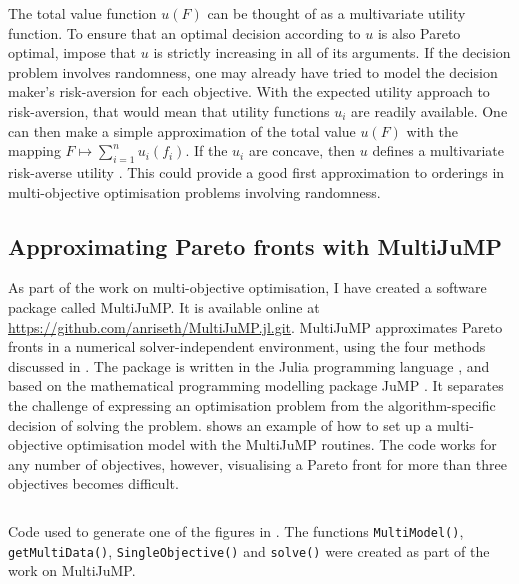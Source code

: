 \documentclass[main.tex]{subfiles}
\begin{document}
The total value function $u(F)$ can be thought of as a
multivariate utility function. To ensure that an optimal decision
according to $u$ is also Pareto optimal, impose that $u$ is
strictly increasing in all of its arguments.
If the decision problem involves randomness, one may already have
tried to model the decision maker's risk-aversion for each objective.
With the expected utility approach to risk-aversion, that would mean
that utility functions $u_i$ are readily available. One can then make
a simple approximation of
the total value $u(F)$ with the mapping $F\mapsto \sum_{i=1}^n u_i(f_i)$.
If the $u_i$ are concave, then $u$ defines a multivariate risk-averse
utility \citep[Sec. 2.3.2]{campi2011multivariate}.
This could provide a good first approximation to orderings in
multi-objective optimisation problems involving randomness.


\subsection{Approximating Pareto fronts with
  MultiJuMP}\label{sec:one_multijump}
As part of the work on multi-objective optimisation, I have created a
software package called MultiJuMP.  It is available online at
\url{https://github.com/anriseth/MultiJuMP.jl.git}.  MultiJuMP
approximates Pareto fronts in a numerical solver-independent
environment, using the four methods discussed in
.  The package is written in the Julia
programming language \citep{bezanson2017julia}, and based on the
mathematical programming modelling package JuMP
\citep{dunning2017jump}. It separates the challenge of expressing an
optimisation problem from the algorithm-specific decision of solving
the problem.  shows an example of how to set up a
multi-objective optimisation model with the MultiJuMP routines. The
code works for any number of objectives, however, visualising a Pareto
front for more than three objectives becomes difficult.
\begin{listing}[htbp]
  \inputminted{julia}{./include/multijump.jl}
  \caption{Code used to generate one of the figures in
    .
    The functions \texttt{MultiModel()},
    \texttt{getMultiData()},
    \texttt{SingleObjective()} and \texttt{solve()}
    were created as part of the work on MultiJuMP.
  }\label{lst:multijump}
\end{listing}


\biblio{} %
\end{document}
